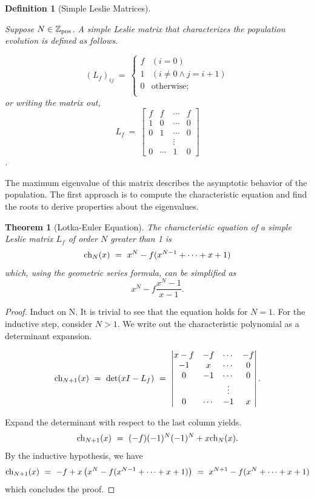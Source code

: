 \documentclass[11pt,reqno]{amsart}
\numberwithin{equation}{section}
\theoremstyle{plain}
\newtheorem{definition}[thm]{Definition}
\newtheorem{theorem}[thm]{Theorem}
\newcommand{\ch}{\textnormal{ch}}
\begin{document}
\begin{definition}[Simple Leslie Matrices]
    \label{LeslieDef}

    Suppose $N \in \mathbb{Z}_{\rm pos}$. A simple Leslie matrix that 
    characterizes the population evolution is defined as follows. 

    \[
        (L_f)_{ij} \ =\ \begin{cases}
            f & (i = 0)\\
            1 & (i \neq 0 \wedge j=i+1)\\
            0 & \textrm{otherwise;}\\
        \end{cases}
    \]
        or writing the matrix out, 
    \[L_f \ =\
    \begin{bmatrix}
        f & f& \cdots & f \\ 
        1 & 0 & \cdots & 0 \\
        0 & 1 & \cdots & 0\\
        &&\vdots &\\
        0 & \cdots & 1 & 0
    \end{bmatrix} 
    \]. 
\end{definition}


The maximum eigenvalue of this matrix describes the asymptotic 
behavior of the population. The first approach is to compute the characteristic 
equation and find the roots to derive properties about the eigenvalues. 


\begin{theorem}[Lotka-Euler Equation]
    \label{LEeq}
    The characteristic equation of a simple Leslie matrix $L_f$ of 
    order $N$ greater than 1 is 
    \[
        \ch_N(x) \ = \ x^N - f(x^{N-1} + \cdots + x + 1)
    \]
    which, using the geometric series formula, can be simplified as 
    \[
        x^{N} - f \frac {x^N - 1} {x - 1}. 
    \]
\end{theorem}

\begin{proof} Induct on N. It is trivial to see that the equation holds for 
$N = 1$. For the inductive step, consider $N > 1$. We write out the 
characteristic polynomial as a determinant expansion. 

\[
    \ch_{N + 1}(x) \ = \ \textrm{det}(xI - L_f) 
    \ = \ 
    \begin{vmatrix}
        x - f & -f& \cdots & -f \\ 
        -1 & x & \cdots & 0 \\
        0 & -1 & \cdots & 0\\
        &&\vdots &\\
        0 & \cdots & -1 & x
    \end{vmatrix} . 
\]

Expand the determinant with respect to the last column yields. 
\[
    \ch_{N + 1}(x) \ = \ 
    (-f)(-1)^N(-1)^N + x\ch_{N}(x). 
\]
By the inductive hypothesis, we have
\[
    \ch_{N + 1}(x) \ = \ 
    -f + x\left(
    x^N - f(x^{N-1} + \cdots + x + 1)
    \right)
    \ = \ 
x^{N + 1} - f(x^{N} + \cdots + x + 1)
\]
which concludes the proof. 
\end{proof}
\end{document}
